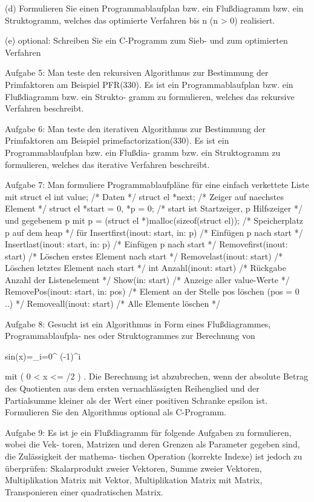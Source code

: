(d) Formulieren Sie einen Programmablaufplan bzw. ein Flußdiagramm bzw. ein Struktogramm, welches das optimierte Verfahren bis n (n > 0) realisiert.

(e) optional: Schreiben Sie ein C-Programm zum Sieb- und zum optimierten Verfahren

Aufgabe 5: Man teste den rekursiven Algorithmus zur Bestimmung der Primfaktoren am
Beispiel PFR(330). Es ist ein Programmablaufplan bzw. ein Flußdiagramm bzw. ein Strukto-
gramm zu formulieren, welches das rekursive Verfahren beschreibt.

Aufgabe 6: Man teste den iterativen Algorithmus zur Bestimmung der Primfaktoren am
Beispiel primefactorization(330). Es ist ein Programmablaufplan bzw. ein Flußdia-
gramm bzw. ein Struktogramm zu formulieren, welches das iterative Verfahren beschreibt.

Aufgabe 7: Man formuliere Programmablaufpläne für eine einfach verkettete Liste mit
struct el { int value; /* Daten */
struct el *next; /* Zeiger auf naechstes Element */
}
struct el *start = 0, *p = 0; /* start ist Startzeiger, p Hilfszeiger */ und gegebenem p mit
p = (struct el *)malloc(sizeof(struct el)); /* Speicherplatz p auf dem heap */
für
Insertfirst(inout: start, in: p)
/* Einfügen p nach start */
Insertlast(inout: start, in: p)
/* Einfügen p nach start */
Removefirst(inout: start)
/* Löschen erstes Element nach start */
Removelast(inout: start)
/* Löschen letztes Element nach start */
int Anzahl(inout: start)
/* Rückgabe Anzahl der Listenelement */
Show(in: start)
/* Anzeige aller value-Werte */
RemovePos(inout: start, in: pos) /* Element an der Stelle pos löschen (pos = 0 ..) */
Removeall(inout: start)
/* Alle Elemente löschen */

Aufgabe 8: Gesucht ist ein Algorithmus in Form eines Flußdiagrammes, Programmablaufpla-
nes oder Struktogrammes zur Berechnung von

sin(x)=\Sigma_{i=0}^{\infty} (-1)^i \cdot {}

mit ( 0 < x <= \pi/2 ) . Die Berechnung ist abzubrechen, wenn der absolute Betrag des Quotienten
aus dem ersten vernachlässigten Reihenglied und der Partialsumme kleiner als der Wert einer
positiven Schranke epsilon ist. Formulieren Sie den Algorithmus optional als C-Programm.

Aufgabe 9: Es ist je ein Flußdiagramm für folgende Aufgaben zu formulieren, wobei die Vek-
toren, Matrizen und deren Grenzen als Parameter gegeben sind, die Zulässigkeit der mathema-
tischen Operation (korrekte Indexe) ist jedoch zu überprüfen:
Skalarprodukt zweier Vektoren, Summe zweier Vektoren, Multiplikation Matrix mit Vektor,
Multiplikation Matrix mit Matrix, Transponieren einer quadratischen Matrix.
